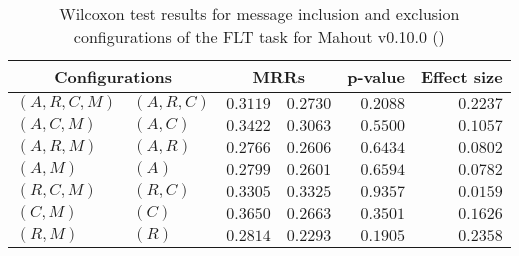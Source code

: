 
\begin{table}
\begin{spacing}{1.2}
\centering
\caption{Wilcoxon test results for message inclusion and exclusion configurations of the FLT task for Mahout v0.10.0 (\ctwo)}
\label{table:versus-wilcox-mahout-flt-message}
\begin{tabular}{ll|rr|rr}
\toprule
      \multicolumn{2}{c|}{Configurations} &                \multicolumn{2}{c|}{MRRs} &             p-value & Effect size \\
\midrule
 $(A,R,C,M)$ &  $(A,R,C)$ &  $\bm{0.3119}$ &       $0.2730$ & $0.2088$ &    $0.2237$ \\
   $(A,C,M)$ &    $(A,C)$ &  $\bm{0.3422}$ &       $0.3063$ & $0.5500$ &    $0.1057$ \\
   $(A,R,M)$ &    $(A,R)$ &  $\bm{0.2766}$ &       $0.2606$ & $0.6434$ &    $0.0802$ \\
     $(A,M)$ &      $(A)$ &  $\bm{0.2799}$ &       $0.2601$ & $0.6594$ &    $0.0782$ \\
   $(R,C,M)$ &    $(R,C)$ &       $0.3305$ &  $\bm{0.3325}$ & $0.9357$ &    $0.0159$ \\
     $(C,M)$ &      $(C)$ &  $\bm{0.3650}$ &       $0.2663$ & $0.3501$ &    $0.1626$ \\
     $(R,M)$ &      $(R)$ &  $\bm{0.2814}$ &       $0.2293$ & $0.1905$ &    $0.2358$ \\
\bottomrule
\end{tabular}

\end{spacing}
\end{table}


